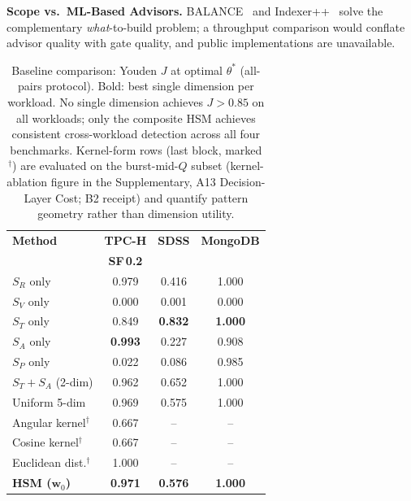 \documentclass[10pt,journal,compsoc]{IEEEtran}
\newcommand{\SR}{S_{R}}
\newcommand{\SV}{S_{V}}
\newcommand{\ST}{S_{T}}
\newcommand{\SA}{S_{A}}
\newcommand{\SPER}{S_{P}}
\begin{document}
\textbf{Scope vs.\ ML-Based Advisors.}
BALANCE~\cite{Wang2024BALANCE} and Indexer++~\cite{Sharma2022IndexerPP}
solve the complementary \emph{what}-to-build problem; a throughput
comparison would conflate advisor quality with gate quality, and
public implementations are unavailable.

\begin{table}[!htb]\centering\scriptsize
\caption{Baseline comparison: Youden $J$ at optimal $\theta^{*}$
(all-pairs protocol). Bold: best single dimension per workload.
No single dimension achieves $J\!>\!0.85$ on all workloads;
only the composite HSM achieves consistent cross-workload detection
across all four benchmarks. Kernel-form rows (last block, marked $^{\dagger}$)
are evaluated on the burst-mid-$Q$ subset (kernel-ablation
figure in the Supplementary, A13 Decision-Layer Cost; B2 receipt)
and quantify pattern geometry rather than dimension utility.}\label{tab:baselines}
\setlength{\tabcolsep}{3pt}
\begin{tabular}{@{}lccc@{}}
\toprule
\textbf{Method} & \textbf{TPC-H} & \textbf{SDSS} & \textbf{MongoDB}\\
 & \textbf{SF\,0.2} & & \\
\midrule
$\SR$ only       & 0.979 & 0.416 & 1.000\\
$\SV$ only       & 0.000 & 0.001 & 0.000\\
$\ST$ only       & 0.849 & \textbf{0.832} & \textbf{1.000}\\
$\SA$ only       & \textbf{0.993} & 0.227 & 0.908\\
$\SPER$ only     & 0.022 & 0.086 & 0.985\\
\midrule
$\ST\!+\!\SA$ (2-dim) & 0.962 & 0.652 & 1.000\\
Uniform 5-dim    & 0.969 & 0.575 & 1.000\\
\midrule
Angular kernel$^{\dagger}$   & 0.667 & -- & --\\
Cosine kernel$^{\dagger}$    & 0.667 & -- & --\\
Euclidean dist.$^{\dagger}$  & 1.000 & -- & --\\
\midrule
\textbf{HSM ($\mathbf{w}_0$)} & \textbf{0.971} & \textbf{0.576} & \textbf{1.000}\\
\bottomrule
\end{tabular}
\end{table}
\end{document}
